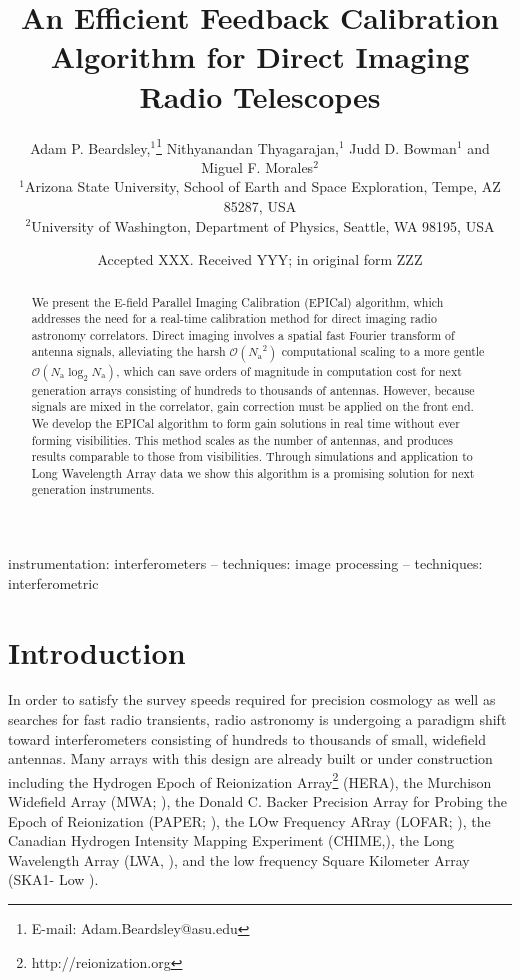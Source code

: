 \documentclass[a4paper,fleqn,usenatbib]{mnras}
\title[EPICal]{An Efficient Feedback Calibration Algorithm for Direct Imaging Radio Telescopes
}
\author[Beardsley et al.]{
Adam P. Beardsley,$^{1}$\thanks{E-mail: Adam.Beardsley@asu.edu}
Nithyanandan Thyagarajan,$^{1}$
Judd D. Bowman$^{1}$
\newauthor
and Miguel F. Morales$^{2}$
\\
$^{1}$Arizona State University, School of Earth and Space Exploration, Tempe, AZ 85287, USA\\
$^{2}$University of Washington, Department of Physics, Seattle, WA 98195, USA\\
}
\date{Accepted XXX. Received YYY; in original form ZZZ}
\newcommand{\Nant}{\ensuremath{N_{\mathrm{a}}}}
\begin{document}
\label{firstpage}
\pagerange{\pageref{firstpage}--\pageref{lastpage}}
\maketitle

\begin{abstract}
We present the E-field Parallel Imaging Calibration (EPICal) algorithm, which addresses the 
need for a real-time calibration method for direct imaging radio astronomy correlators. Direct 
imaging involves a spatial fast Fourier transform of antenna signals, alleviating the harsh 
$\mathcal{O}(\Nant^2)$ computational scaling to a more gentle $\mathcal{O}(\Nant \log_2 
\Nant)$, which can save orders of magnitude in computation cost for next generation arrays 
consisting of hundreds to thousands of antennas. However, because signals are mixed in the 
correlator, gain correction must be applied on the front end. We develop the EPICal algorithm 
to form gain solutions in real time without ever forming visibilities. This method scales as the 
number of antennas, and produces results comparable to those from visibilities. Through 
simulations and application to Long Wavelength Array data we show this algorithm is a 
promising solution for next generation instruments.
\end{abstract}

\begin{keywords}
instrumentation: interferometers -- techniques: image processing -- techniques: interferometric
\end{keywords}



\section{Introduction}
In order to satisfy the survey speeds required for precision cosmology as well as searches for 
fast radio transients, radio astronomy is undergoing a paradigm shift toward interferometers 
consisting of hundreds to thousands of small, widefield antennas. Many arrays with this design 
are already built or under construction including the Hydrogen Epoch of Reionization 
Array\footnote{http://reionization.org} (HERA), the Murchison Widefield Array (MWA; 
\citealt{tin13,bow13}), the Donald C. Backer Precision Array for Probing the Epoch of 
Reionization (PAPER; \citealt{par10}), the LOw Frequency ARray (LOFAR; \citealt{van13}), the 
Canadian Hydrogen Intensity Mapping Experiment (CHIME,\citealt{ban14}), the Long 
Wavelength Array (LWA, \citealt{ell13}), and the low frequency Square Kilometer Array (SKA1-
Low \citealt{mel13}).
\end{document}
